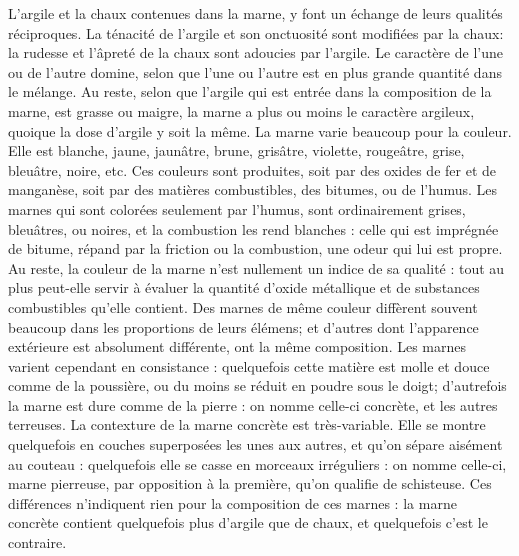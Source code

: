 L'argile et la chaux contenues dans la marne, y font un échange de leurs qualités réciproques. La ténacité de l'argile et son onctuosité sont modifiées par la chaux: la rudesse et l'âpreté de la chaux sont adoucies par l'argile. Le caractère de l'une ou de l'autre domine, selon que l'une ou l'autre est en plus grande quantité dans le mélange. Au reste, selon que l'argile qui est entrée dans la composition de la marne, est grasse ou maigre, la marne a plus ou moins le caractère argileux, quoique la dose d'argile y soit la même.
La marne varie beaucoup pour la couleur. Elle est blanche, jaune, jaunâtre, brune, grisâtre, violette, rougeâtre, grise, bleuâtre, noire, etc. Ces couleurs sont produites, soit par des oxides de fer et de manganèse, soit\setcounter{page}{48} par des matières combustibles, des bitumes, ou de l'humus. Les marnes qui sont colorées seulement par l'humus, sont ordinairement grises, bleuâtres, ou noires, et la combustion les rend blanches : celle qui est imprégnée de bitume, répand par la friction ou la combustion, une odeur qui lui est propre.
Au reste, la couleur de la marne n'est nullement un indice de sa qualité : tout au plus peut-elle servir à évaluer la quantité d'oxide métallique et de substances combustibles qu'elle contient. Des marnes de même couleur diffèrent souvent beaucoup dans les proportions de leurs élémens; et d'autres dont l'apparence extérieure est absolument différente, ont la même composition.
Les marnes varient cependant en consistance : quelquefois cette matière est molle et douce comme de la poussière, ou du moins se réduit en poudre sous le doigt; d'autrefois la marne est dure comme de la pierre : on nomme celle-ci concrète, et les autres terreuses. La contexture de la marne concrète est très-variable. Elle se montre quelquefois en couches superposées les unes aux autres, et qu'on sépare aisément au couteau : quelquefois elle se casse en morceaux irréguliers : on nomme celle-ci, marne pierreuse, par opposition à la première, qu'on\setcounter{page}{49} qualifie de schisteuse. Ces différences n'indiquent rien pour la composition de ces marnes : la marne concrète contient quelquefois plus d'argile que de chaux, et quelquefois c'est le contraire.
